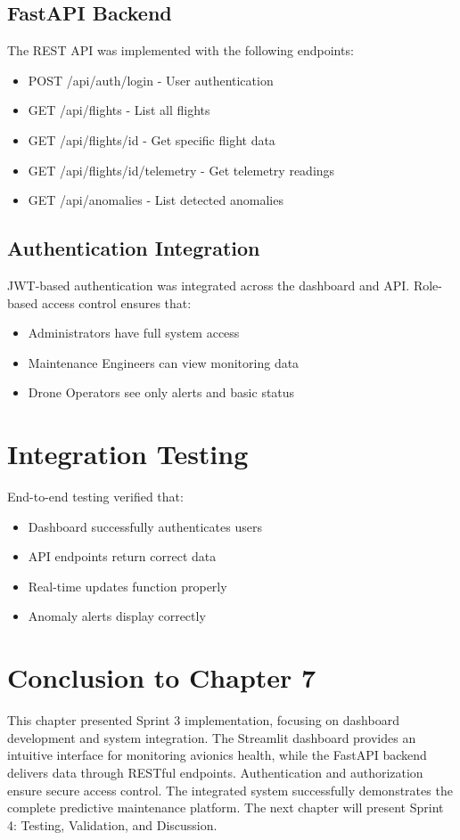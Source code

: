 \subsection{FastAPI Backend}

The REST API was implemented with the following endpoints:
\begin{itemize}
    \item POST /api/auth/login - User authentication
    \item GET /api/flights - List all flights
    \item GET /api/flights/{id} - Get specific flight data
    \item GET /api/flights/{id}/telemetry - Get telemetry readings
    \item GET /api/anomalies - List detected anomalies
\end{itemize}

\subsection{Authentication Integration}

JWT-based authentication was integrated across the dashboard and API. Role-based access control ensures that:
\begin{itemize}
    \item Administrators have full system access
    \item Maintenance Engineers can view monitoring data
    \item Drone Operators see only alerts and basic status
\end{itemize}

\section{Integration Testing}

End-to-end testing verified that:
\begin{itemize}
    \item Dashboard successfully authenticates users
    \item API endpoints return correct data
    \item Real-time updates function properly
    \item Anomaly alerts display correctly
\end{itemize}

\section*{Conclusion to Chapter 7}

This chapter presented Sprint 3 implementation, focusing on dashboard development and system integration. The Streamlit dashboard provides an intuitive interface for monitoring avionics health, while the FastAPI backend delivers data through RESTful endpoints. Authentication and authorization ensure secure access control. The integrated system successfully demonstrates the complete predictive maintenance platform. The next chapter will present Sprint 4: Testing, Validation, and Discussion.
